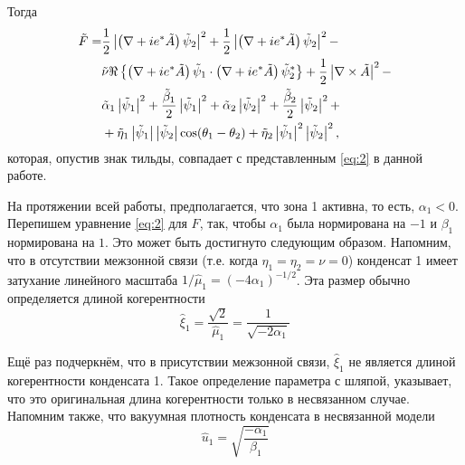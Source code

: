 Тогда
\begin{align}
  \tilde{F} = & \frac{1}{2}\left| \left( \nabla + ie^*\tilde{A} \right)
    \tilde{\psi}_2 \right|^2 + \frac{1}{2}\left| \left( \nabla + ie^*\tilde{A} \right)
    \tilde{\psi}_2 \right|^2 - \nonumber \\ 
  & \tilde{\nu} \Re\left\{ \left( \nabla + ie^*\tilde{A}
    \right)\tilde{\psi}_1 \cdot \left( \nabla + ie^*\tilde{A} \right)
    \tilde{\psi}^*_2 \right\} + \frac{1}{2}\left| \nabla\times\tilde{A} \right|^2 - 
    \nonumber \\
  & \tilde{\alpha}_1
    \left| \tilde{\psi}_1 \right|^2 + \frac{\tilde{\beta}_1}{2}\left| \tilde{\psi}_1 \right|^2 +
    \tilde{\alpha}_2\left| \tilde{\psi}_2 \right|^2 +
    \frac{\tilde{\beta}_2}{2}\left| \tilde{\psi}_2 \right|^2 + \nonumber \\
  & + \tilde{\eta}_1 \left| \tilde{\psi}_1 \right| \left| \tilde{\psi}_2 \right|
    \cos(\theta_1 - \theta_2) + \tilde{\eta}_2\left| \tilde{\psi}_1 \right|^2
    \left| \tilde{\psi}_2 \right|^2, \label{eq:B-3}
\end{align}
которая, опустив знак тильды, совпадает с представленным \eqref{eq:2} в
данной работе.

На протяжении всей работы, предполагается, что зона 1 активна, то есть, 
\( \alpha_1 < 0 \). Перепишем уравнение \eqref{eq:2} для \( F \), так, чтобы 
\( \alpha_1 \) была нормирована на \( -1 \) и \( \beta_1 \) нормирована на 
\( 1 \). Это может быть достигнуто следующим образом. Напомним, что в 
отсутствии межзонной связи (т.е. когда \( \eta_1 = \eta_2 = \nu = 0 \)) 
конденсат 1 имеет затухание линейного масштаба 
\( 1/\hat{\mu}_1 = (-4\alpha_1)^{-1/2} \). Эта размер обычно определяется 
длиной когерентности
\begin{equation}
    \hat{\xi}_1 = \frac{\sqrt{2}}{\hat{\mu}_1} = \frac{1}{\sqrt{-2\alpha_1}}
    \label{eq:A-4}
\end{equation}

Ещё раз подчеркнём, что в присутствии межзонной связи, \( \hat{\xi}_1 \) не
является длиной когерентности конденсата 1. Такое определение параметра с 
шляпой, указывает, что это оригинальная длина когерентности только в 
несвязанном случае. Напомним также, что вакуумная плотность конденсата в 
несвязанной модели
\begin{equation}
    \hat{u}_1 = \sqrt{\frac{-\alpha_1}{\beta_1}}
    \label{eq:B-5}
\end{equation}

